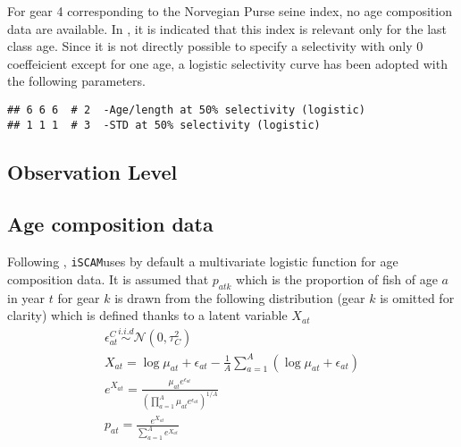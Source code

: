 \documentclass[a4paper]{article}\usepackage{graphicx, color}
\makeatletter
\newenvironment{kframe}{%
 \def\at@end@of@kframe{}%
 \ifinner\ifhmode%
  \def\at@end@of@kframe{\end{minipage}}%
  \begin{minipage}{\columnwidth}%
 \fi\fi%
 \def\FrameCommand##1{\hskip\@totalleftmargin \hskip-\fboxsep
 \colorbox{shadecolor}{##1}\hskip-\fboxsep
     \hskip-\linewidth \hskip-\@totalleftmargin \hskip\columnwidth}%
 \MakeFramed {\advance\hsize-\width
   \@totalleftmargin\z@ \linewidth\hsize
   \@setminipage}}%
 {\par\unskip\endMakeFramed%
 \at@end@of@kframe}
\newenvironment{knitrout}{}{} %
\newcommand{\iscam}{\texttt{iSCAM}}
\makeatother
\begin{document}
For gear  4 corresponding to the  Norvegian Purse seine index,  no age
composition data  are available.  In \cite{tuna2012}, it  is indicated
that this index is  relevant only for the last class  age. Since it is
not  directly   possible  to  specify   a  selectivity  with   only  0
coeffeicient except for one age,  a logistic selectivity curve has been
adopted with the following parameters.
\begin{knitrout}
\color{fgcolor}\begin{kframe}
\begin{verbatim}
## 6 6 6  # 2  -Age/length at 50% selectivity (logistic)
## 1 1 1  # 3  -STD at 50% selectivity (logistic)
\end{verbatim}
\end{kframe}
\end{knitrout}


\subsection{Observation Level}
\subsection{Age composition data}

Following  \cite{Schnute+95}, \iscam  uses by  default a  multivariate
logistic  function  for  age  composition data.  It  is  assumed  that
$p_{atk}$ which is the  proportion of fish of age $a$  in year $t$ for
gear $k$ is drawn from the following distribution (gear $k$ is omitted
for clarity) which is defined thanks to a latent variable $X_{at}$
\begin{gather}
\epsilon^{C}_{at} \overset{i.i.d}{\sim} \mathcal{N}(0,\tau^2_C)\\
X_{at}       =       \log{\mu_{at}}       +       \epsilon_{at}       -
\frac{1}{A}\sum_{a=1}^A\left(\log{\mu_{at}} + \epsilon_{at} \right) \\
e^{X_{at}} = \frac{\mu_{at}e^{\epsilon_{at}}}{ \left(\prod_{a=1}^A \mu_{at}e^{\epsilon_{at}}\right) ^{1/A}}\\
p_{at} = \frac{e^{X_{at}} } {\sum_{a=1}^A e^{X_{at}} }\\
\end{gather}
\end{document}
